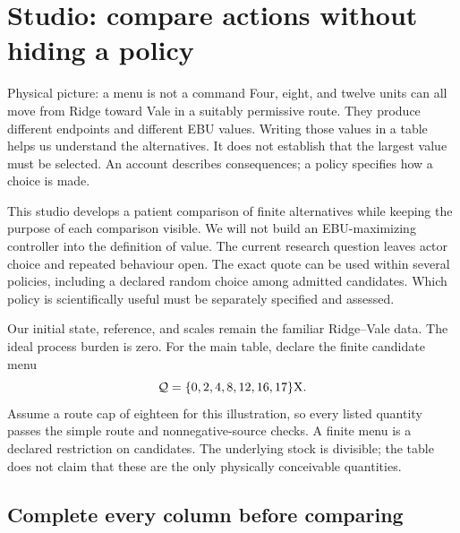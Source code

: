 \chapter{Studio: compare actions without hiding a policy}\label{ch:studio-choice}

\begin{intuitionbox}{Physical picture: a menu is not a command}
Four, eight, and twelve units can all move from Ridge toward Vale in a suitably permissive route. They produce different endpoints and different EBU values. Writing those values in a table helps us understand the alternatives. It does not establish that the largest value must be selected. An account describes consequences; a policy specifies how a choice is made.
\end{intuitionbox}

This studio develops a patient comparison of finite alternatives while keeping the purpose of each comparison visible. We will not build an EBU-maximizing controller into the definition of value. The current research question leaves actor choice and repeated behaviour open. The exact quote can be used within several policies, including a declared random choice among admitted candidates. Which policy is scientifically useful must be separately specified and assessed.

Our initial state, reference, and scales remain the familiar Ridge--Vale data. The ideal process burden is zero. For the main table, declare the finite candidate menu
\begin{equation}
\mathcal Q=\{0,2,4,8,12,16,17\}\mathrm{X}.
\end{equation}
Assume a route cap of eighteen for this illustration, so every listed quantity passes the simple route and nonnegative-source checks. A finite menu is a declared restriction on candidates. The underlying stock is divisible; the table does not claim that these are the only physically conceivable quantities.

\section{Complete every column before comparing}

